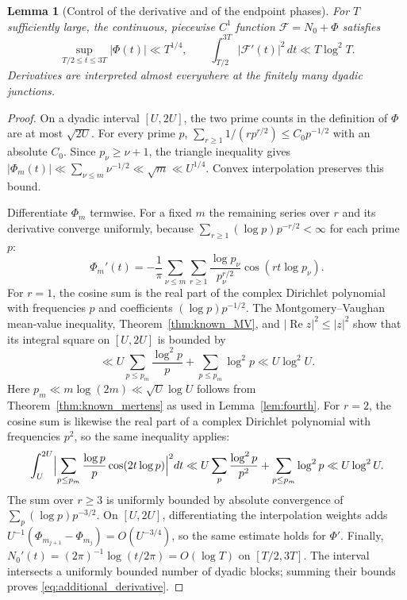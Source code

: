 \documentclass[11pt,a4paper]{article}
\makeatletter
\numberwithin{equation}{section}
\DeclareRobustCommand{\CGref}[1]{\ref{#1}}
\DeclareRobustCommand{\CGeqref}[1]{\eqref{#1}}
\let\CG@origref\ref
\let\CG@origeqref\eqref
\newcommand{\CG@gettip}[1]{\@ifundefined{CGTip@#1}{#1}{\csname CGTip@#1\endcsname}}
\DeclareRobustCommand{\CGref}[1]{\pdftooltip{\CG@origref{#1}}{\CG@gettip{#1}}}
\DeclareRobustCommand{\CGeqref}[1]{\pdftooltip{\CG@origeqref{#1}}{\CG@gettip{#1}}}
\newtheorem{lemma}[theorem]{Lemma}
\theoremstyle{definition}
\theoremstyle{remark}
\newcommand{\Nz}{N_0} %
\newcommand{\Fc}{\mathcal F}
\newcommand{\Ph}{\Phi}
\makeatother
\begin{document}
\begin{lemma}[Control of the derivative and of the endpoint phases]\label{lem:additional_derivative}
For $T$ sufficiently large, the continuous, piecewise $C^1$ function $\Fc=\Nz+\Ph$ satisfies
\begin{equation}
\sup_{T/2\le t\le3T}|\Ph(t)|\ll T^{1/4},
\qquad
\int_{T/2}^{3T}|\Fc'(t)|^2\,dt\ll T\log^2T.
\label{eq:additional_derivative}
\end{equation}
Derivatives are interpreted almost everywhere at the finitely many dyadic junctions.
\end{lemma}
\begin{proof}
On a dyadic interval $[U,2U]$, the two prime counts in the definition of
$\Ph$ are at most $\sqrt{2U}$. For every prime $p$,
$\sum_{r\ge1}1/(rp^{r/2})\le C_0p^{-1/2}$ with an absolute $C_0$.
Since $p_\nu\ge\nu+1$, the triangle inequality gives
$|\Ph_m(t)|\ll\sum_{\nu\le m}\nu^{-1/2}\ll\sqrt m\ll U^{1/4}$.
Convex interpolation preserves this bound.

Differentiate $\Ph_m$ termwise. For a fixed $m$ the remaining series over $r$ and its derivative converge uniformly, because $\sum_{r\ge1}(\log p)p^{-r/2}<\infty$ for each prime $p$:
\begin{equation}
\Ph_m'(t)=-\frac1\pi\sum_{\nu\le m}\sum_{r\ge1}
\frac{\log p_\nu}{p_\nu^{r/2}}\cos(rt\log p_\nu).
\label{eq:disp_40}
\end{equation}
For $r=1$, the cosine sum is the real part of the complex Dirichlet polynomial with frequencies $p$ and coefficients $(\log p)p^{-1/2}$.
The Montgomery--Vaughan mean-value inequality, Theorem~\CGref{thm:known_MV}, and $|\operatorname{Re}z|^2\le|z|^2$ show that its integral square on
$[U,2U]$ is bounded by
\begin{equation}
\ll U\sum_{p\le p_m}\frac{\log^2p}{p}
 +\sum_{p\le p_m}\log^2p
\ll U\log^2U.
\label{eq:disp_41}
\end{equation}
Here $p_m\ll m\log(2m)\ll\sqrt U\log U$ follows from
Theorem~\CGref{thm:known_mertens} as used in Lemma~\CGref{lem:fourth}.
For $r=2$, the cosine sum is likewise the real part of a complex Dirichlet polynomial with frequencies $p^2$, so the same inequality applies:
\begin{equation}
\int_U^{2U}\Bigl|\sum_{p\le p_m}
\frac{\log p}{p}\cos(2t\log p)\Bigr|^2dt
\ll U\sum_p\frac{\log^2p}{p^2}
+\sum_{p\le p_m}\log^2p
\ll U\log^2U.
\label{eq:disp_42}
\end{equation}
The sum over $r\ge3$ is uniformly bounded by absolute convergence of
$\sum_p(\log p)p^{-3/2}$.
On $[U,2U]$, differentiating the interpolation weights adds
$U^{-1}(\Ph_{m_{j+1}}-\Ph_{m_j})=O(U^{-3/4})$, so the same estimate holds
for $\Ph'$.
Finally, $\Nz'(t)=(2\pi)^{-1}\log(t/2\pi)=O(\log T)$ on
$[T/2,3T]$. The interval intersects a uniformly bounded number of dyadic blocks;
summing their bounds proves \CGeqref{eq:additional_derivative}.
\end{proof}
\end{document}
